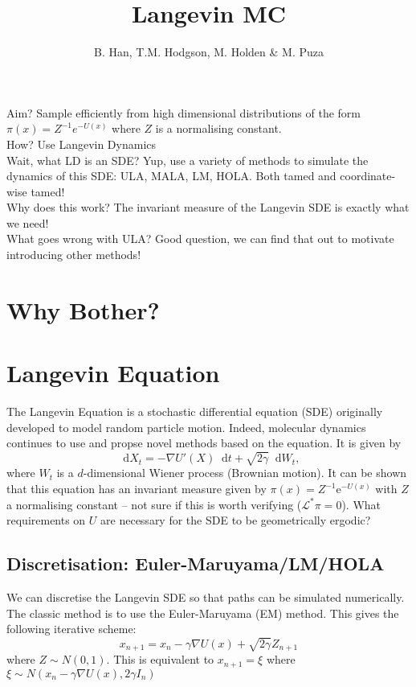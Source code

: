 \documentclass[a4paper]{article}
\title{Langevin MC}
\author{B. Han, T.M. Hodgson, M. Holden \& M. Puza}
\theoremstyle{definition}
\renewcommand{\L}{\mathcal{L}}
\newcommand{\e}{\mathrm{e}}
\newcommand{\dif}{\mathop{}\!\mathrm{d}}
\begin{document}
	\maketitle 
	Aim? Sample efficiently from high dimensional distributions of the form \(\pi(x) = Z^{-1} e^{-U(x)}\) where \(Z\) is a normalising constant.\\
	How? Use Langevin Dynamics\\
	Wait, what LD is an SDE? Yup, use a variety of methods to simulate the dynamics of this SDE: ULA, MALA, LM, HOLA. Both tamed and coordinate-wise tamed!\\
	Why does this work? The invariant measure of the Langevin SDE is exactly what we need!\\
	What goes wrong with ULA? Good question, we can find that out to motivate introducing other methods!\\
	\section{Why Bother?}
	\section{Langevin Equation}
	The Langevin Equation is a stochastic differential equation (SDE) originally developed to model random particle motion. Indeed, molecular dynamics continues to use and propse novel methods based on the equation. It is given by 	\[\dif X_t = -\nabla U'(X)\dif t +\sqrt{2\gamma}\dif W_t,\]
	where \(W_t\) is a \(d\)-dimensional Wiener process (Brownian motion). It can be shown that this equation has an invariant measure given by \(\pi(x)=Z^{-1}\e^{-U(x)}\) with \(Z\) a normalising constant -- not sure if this is worth verifying (\(\L^*\pi=0 \)). What requirements on \(U\) are necessary for the SDE to be geometrically ergodic?
	
	
	
		\subsection{Discretisation: Euler-Maruyama/LM/HOLA}
		We can discretise the Langevin SDE so that paths can be simulated numerically. The classic method is to use the Euler-Maruyama (EM) method. This gives the following iterative scheme:
		\[x_{n+1}=x_n - \gamma \nabla U(x) +\sqrt{2\gamma}Z_{n+1} \]
		where \(Z \sim N(0,1)\). This is equivalent to 
		\(x_{n+1} = \xi\) where \(\xi \sim N\left(x_n-\gamma \nabla U(x), 2\gamma I_n\right)\)
		
\end{document}
